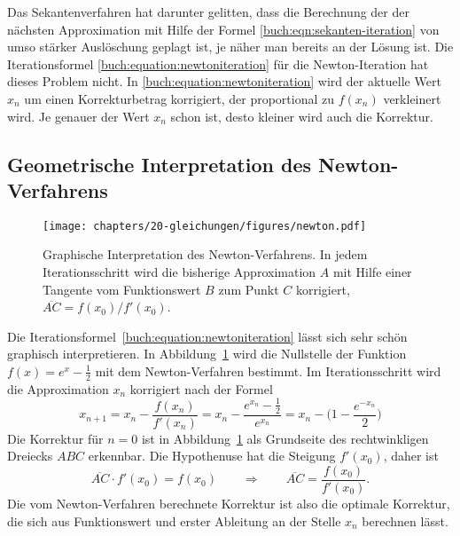 Das Sekantenverfahren hat darunter gelitten, dass die Berechnung
der der nächsten Approximation mit Hilfe der Formel 
\eqref{buch:eqn:sekanten-iteration} von umso stärker Auslöschung
geplagt ist, je näher man bereits an der Lösung ist.
%
Die Iterationsformel
\eqref{buch:equation:newtoniteration}
für die Newton-Iteration hat dieses Problem nicht.
In \eqref{buch:equation:newtoniteration} wird der aktuelle Wert $x_n$
um einen Korrekturbetrag korrigiert, der proportional zu $f(x_n)$
verkleinert wird.
Je genauer der Wert $x_n$ schon ist, desto kleiner wird auch die
Korrektur.

%
%
\subsection{Geometrische Interpretation des Newton-Verfahrens}
\begin{figure}
\centering
\texttt{[image: chapters/20-gleichungen/figures/newton.pdf]}
\caption{Graphische Interpretation des Newton-Verfahrens.
In jedem Iterationsschritt wird die bisherige Approximation $A$
mit Hilfe einer Tangente vom Funktionswert $B$ zum Punkt $C$
korrigiert, $\overline{AC}=f(x_0)/f'(x_0)$.
\label{buch:figure:newton}}
\end{figure}
Die Iterationsformel~\eqref{buch:equation:newtoniteration}
lässt sich sehr schön graphisch interpretieren.
In Abbildung~\ref{buch:figure:newton} wird die Nullstelle der
Funktion $f(x) = e^x-\frac12$ mit dem Newton-Verfahren bestimmt.
Im Iterationsschritt wird die Approximation $x_n$ korrigiert
nach der Formel
\[
x_{n+1}
=
x_n - \frac{f(x_n)}{f'(x_n)}
=
x_n - \frac{e^{x_n}-\frac12}{e^{x_n}}
=
x_n - \biggl(1 -\frac{e^{-x_n}}{2}\biggr)
\]
Die Korrektur für $n=0$ ist in Abbildung~\ref{buch:figure:newton}
als Grundseite des rechtwinkligen Dreiecks $ABC$ erkennbar.
Die Hypothenuse hat die Steigung $f'(x_0)$, daher ist
%
%
\[
\overline{AC}\cdot f'(x_0) = f(x_0)
\qquad\Rightarrow\qquad
\overline{AC} = \frac{f(x_0)}{f'(x_0)}.
\]
Die vom Newton-Verfahren berechnete Korrektur ist also die optimale
Korrektur, die sich aus Funktionswert und erster Ableitung
an der Stelle $x_n$ berechnen lässt.
%

%
%
